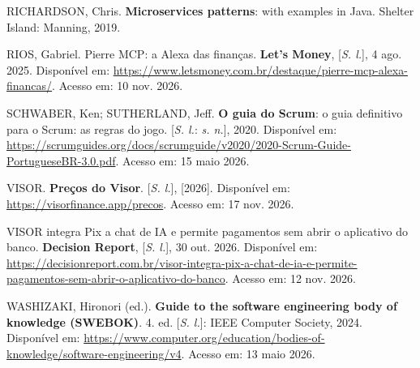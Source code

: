 \vspace{\baselineskip}

RICHARDSON, Chris. \textbf{Microservices patterns}: with examples in Java. Shelter Island: Manning, 2019.

\vspace{\baselineskip}

RIOS, Gabriel. Pierre MCP: a Alexa das finanças. \textbf{Let's Money}, [\textit{S. l.}], 4 ago. 2025. Disponível em: \url{https://www.letsmoney.com.br/destaque/pierre-mcp-alexa-financas/}. Acesso em: 10 nov. 2026.

\vspace{\baselineskip}

SCHWABER, Ken; SUTHERLAND, Jeff. \textbf{O guia do Scrum}: o guia definitivo para o Scrum: as regras do jogo. [\textit{S. l.}: \textit{s. n.}], 2020. Disponível em: \url{https://scrumguides.org/docs/scrumguide/v2020/2020-Scrum-Guide-PortugueseBR-3.0.pdf}. Acesso em: 15 maio 2026.

\vspace{\baselineskip}

VISOR. \textbf{Preços do Visor}. [\textit{S. l.}], [2026]. Disponível em: \url{https://visorfinance.app/precos}. Acesso em: 17 nov. 2026.

\vspace{\baselineskip}

VISOR integra Pix a chat de IA e permite pagamentos sem abrir o aplicativo do banco. \textbf{Decision Report}, [\textit{S. l.}], 30 out. 2026. Disponível em: \url{https://decisionreport.com.br/visor-integra-pix-a-chat-de-ia-e-permite-pagamentos-sem-abrir-o-aplicativo-do-banco}. Acesso em: 12 nov. 2026.

\vspace{\baselineskip}

WASHIZAKI, Hironori (ed.). \textbf{Guide to the software engineering body of knowledge (SWEBOK)}. 4. ed. [\textit{S. l.}]: IEEE Computer Society, 2024. Disponível em: \url{https://www.computer.org/education/bodies-of-knowledge/software-engineering/v4}. Acesso em: 13 maio 2026.

\endgroup
